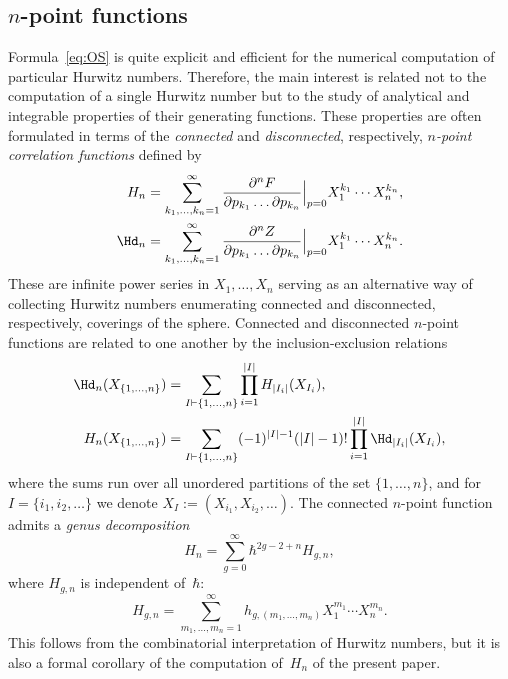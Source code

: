 \subsection{\texorpdfstring{$n$}{n}-point functions}

Formula~\eqref{eq:OS} is quite explicit and efficient for the numerical computation of particular Hurwitz numbers. Therefore, the main interest is related not to the computation of a single Hurwitz number but to the study of analytical and integrable properties of their generating functions. These properties are often formulated in terms of the \emph{connected} and \emph{disconnected}, respectively, \emph{$n$-point correlation functions} defined by\vspace*{-3pt}
\begin{align}\label{eq:Hndef}
H_n&=\sum_{k_1,\dots,k_n=1}^\infty\frac{\partial^n F}{\partial p_{k_1}\dots\partial p_{k_n}}\Big|_{p=0}X_1^{k_1}\cdots X_n^{k_n},\\ \label{eq:Hdndef}
\Hd_n&=\sum_{k_1,\dots,k_n=1}^\infty\frac{\partial^n Z}{\partial p_{k_1}\dots\partial p_{k_n}}\Big|_{p=0}X_1^{k_1}\cdots X_n^{k_n}.
\end{align}
These are infinite power series in $X_1,\dots,X_n$ serving as an alternative way of collecting Hurwitz numbers enumerating connected and disconnected, respectively, coverings of the sphere. Connected and disconnected $n$-point functions are related to one another by the inclusion-exclusion relations\vspace*{-3pt}
\begin{equation}\label{eq:inclexclH}
\begin{aligned}
\Hd_n(X_{\{1,\dots,n\}})&= \sum\limits_{I\vdash\{1,\ldots,n\}}\prod\limits_{i=1}^{|I|}H_{|I_i|}(X_{I_i}),\\
H_n(X_{\{1,\dots,n\}})&= \sum\limits_{I\vdash\{1,\ldots,n\}}(-1)^{|I|-1}(|I|-1)!\prod\limits_{i=1}^{|I|}\Hd_{|I_i|}(X_{I_i}),
\end{aligned}
\end{equation}
where the sums run over all unordered partitions of the set $\{1,\dots,n\}$, and for $I=\{i_1,i_2,\dots\}$ we denote $X_I:=(X_{i_1},X_{i_2},\dots)$. The connected $n$-point function admits a \emph{genus decomposition}
\begin{equation*}
H_n=\sum_{g=0}^\infty \hbar^{2g-2+n}H_{g,n},
\end{equation*}
where $H_{g,n}$ is independent of~$\hbar$:
\begin{equation*}
H_{g,n}=\sum_{m_1,\dots,m_n=1}^\infty h_{g,(m_1,\dots,m_n)}X_1^{m_1}\cdots X_n^{m_n}.
\end{equation*}
This follows from the combinatorial interpretation of Hurwitz numbers, but it is also a formal corollary of the computation of~$H_{n}$ of the present paper.

